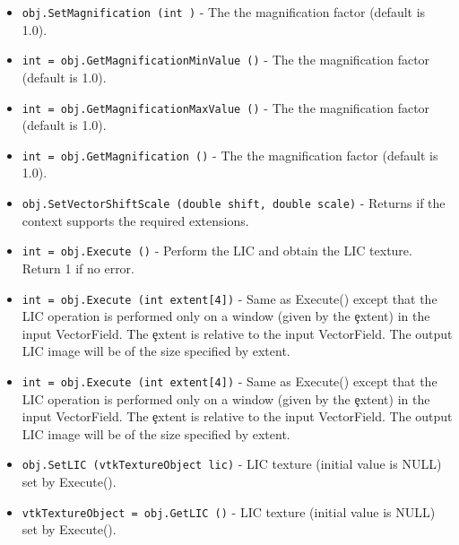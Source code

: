\begin{itemize}
\item  \verb|obj.SetMagnification (int )| -  The the magnification factor (default is 1.0).

\item  \verb|int = obj.GetMagnificationMinValue ()| -  The the magnification factor (default is 1.0).

\item  \verb|int = obj.GetMagnificationMaxValue ()| -  The the magnification factor (default is 1.0).

\item  \verb|int = obj.GetMagnification ()| -  The the magnification factor (default is 1.0).

\item  \verb|obj.SetVectorShiftScale (double shift, double scale)| -  Returns if the context supports the required extensions.

\item  \verb|int = obj.Execute ()| -  Perform the LIC and obtain the LIC texture. Return 1 if no error.

\item  \verb|int = obj.Execute (int extent[4])| -  Same as Execute() except that the LIC operation is performed only on a
 window (given by the \c extent) in the input VectorField. The \c extent
 is relative to the input VectorField. The output LIC image will be of 
 the size specified by extent.

\item  \verb|int = obj.Execute (int extent[4])| -  Same as Execute() except that the LIC operation is performed only on a
 window (given by the \c extent) in the input VectorField. The \c extent
 is relative to the input VectorField. The output LIC image will be of 
 the size specified by extent.

\item  \verb|obj.SetLIC (vtkTextureObject lic)| -  LIC texture (initial value is NULL) set by Execute().

\item  \verb|vtkTextureObject = obj.GetLIC ()| -  LIC texture (initial value is NULL) set by Execute().

\end{itemize}
